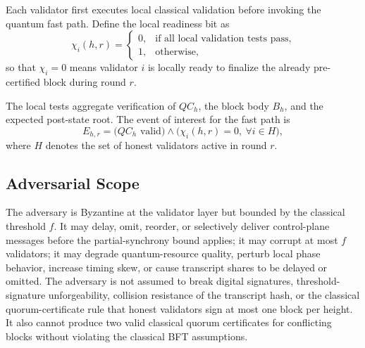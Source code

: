 \documentclass{ieeeaccess}
\begin{document}
Each validator first executes local classical validation before invoking the quantum fast path. Define the local readiness bit as
\begin{equation}
\chi_i(h,r)=
\begin{cases}
0, & \text{if all local validation tests pass},\\
1, & \text{otherwise},
\end{cases}
\label{eq:chi}
\end{equation}
so that $\chi_i=0$ means validator $i$ is locally ready to finalize the already pre-certified block during round $r$.

The local tests aggregate verification of $QC_h$, the block body $B_h$, and the expected post-state root. The event of interest for the fast path is
\begin{equation}
E_{h,r} = \bigl(QC_h \text{ valid}\bigr) \wedge \bigl(\chi_i(h,r)=0,\ \forall i \in H\bigr),
\label{eq:event}
\end{equation}
where $H$ denotes the set of honest validators active in round $r$.

\subsection{Adversarial Scope}
The adversary is Byzantine at the validator layer but bounded by the classical threshold $f$. It may delay, omit, reorder, or selectively deliver control-plane messages before the partial-synchrony bound applies; it may corrupt at most $f$ validators; it may degrade quantum-resource quality, perturb local phase behavior, increase timing skew, or cause transcript shares to be delayed or omitted. The adversary is not assumed to break digital signatures, threshold-signature unforgeability, collision resistance of the transcript hash, or the classical quorum-certificate rule that honest validators sign at most one block per height. It also cannot produce two valid classical quorum certificates for conflicting blocks without violating the classical BFT assumptions.
\end{document}
